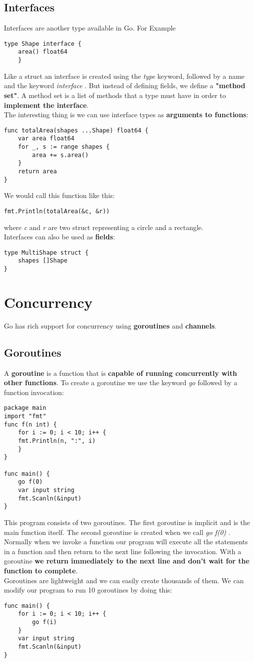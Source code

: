 \documentclass[10pt,letterpaper]{report}
\begin{document}
\section{Interfaces}
Interfaces are another type available in Go. For Example
\begin{lstlisting}
type Shape interface {
	area() float64
	}
\end{lstlisting}
Like a struct an interface is created using the \textit{type} keyword, followed by a name and the keyword \textit{interface} . But instead of defining fields, we define a \textbf{"method set"}. A method set is a list of methods that a type must have in order to \textbf{implement the interface}.\\
The interesting thing is we can use interface types as \textbf{arguments to
functions}:
\begin{lstlisting}
func totalArea(shapes ...Shape) float64 {
	var area float64
	for _, s := range shapes {
		area += s.area()
	}
	return area
}
\end{lstlisting}
We would call this function like this:
\begin{lstlisting}
fmt.Println(totalArea(&c, &r))
\end{lstlisting}
where \textit{c} and \textit{r} are two struct representing a circle and a rectangle.\\
Interfaces can also be used as \textbf{fields}:
\begin{lstlisting}
type MultiShape struct {
	shapes []Shape
}
\end{lstlisting}
\chapter{Concurrency}
Go has rich support for concurrency using \textbf{goroutines} and \textbf{channels}.
\section{Goroutines}
A \textbf{goroutine} is a function that is \textbf{capable of running concurrently with other functions}. To create a goroutine we use the keyword \textit{go} followed by a function invocation:
\begin{lstlisting}
package main
import "fmt"
func f(n int) {
	for i := 0; i < 10; i++ {
	fmt.Println(n, ":", i)
	}
}

func main() {
	go f(0)
	var input string
	fmt.Scanln(&input)
}
\end{lstlisting}
This program consists of two goroutines. The first goroutine is implicit and is the main function itself. The second goroutine is created when we call \textit{go f(0)} . Normally when we invoke a function our program will execute all the statements in a function and then return to the next line following the invocation. With a goroutine \textbf{we return immediately to the next line and don't wait for the function to complete}.\\
Goroutines are lightweight and we can easily create thousands of them. We can modify our program to run 10 goroutines by doing this:
\begin{lstlisting}
func main() {
	for i := 0; i < 10; i++ {
		go f(i)
	}
	var input string
	fmt.Scanln(&input)
}
\end{lstlisting}
\end{document}
